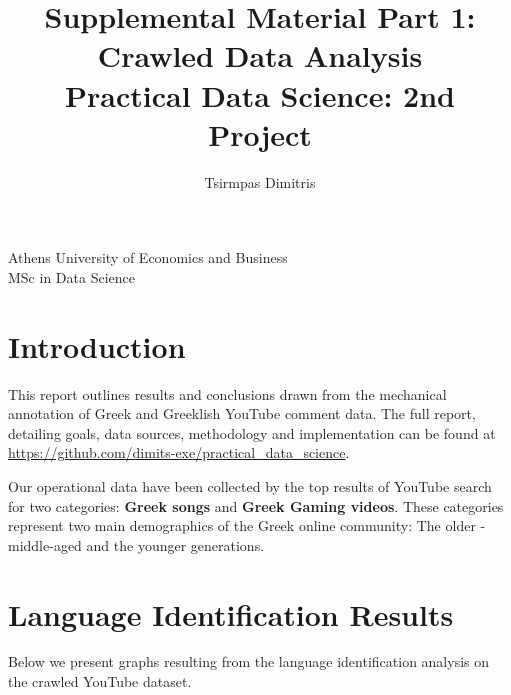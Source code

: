 \documentclass[11pt, a4paper]{article}
\title{\Huge Supplemental Material Part 1: Crawled Data Analysis\\
	\LARGE Practical Data Science: 2nd Project}
\author{\Large  Tsirmpas Dimitris }
\begin{document}
	
	\maketitle
	\begin{center}
		\large Athens University of Economics and Business \\
		\large MSc in Data Science
		
	\end{center}
	
	
	\section{Introduction}
	This report outlines results and conclusions drawn from the mechanical annotation of Greek and Greeklish YouTube comment data. The full report, detailing goals, data sources, methodology and implementation can be found at \url{https://github.com/dimits-exe/practical_data_science}.
	
	Our operational data have been collected by the top results of YouTube search for two categories: \textbf{Greek songs} and \textbf{Greek Gaming videos}. These categories represent two main demographics of the Greek online community: The older - middle-aged and the younger generations.
	
	
	\section{Language Identification Results}
	
	Below we present graphs resulting from the language identification analysis on the crawled YouTube dataset.
	
\end{document}
